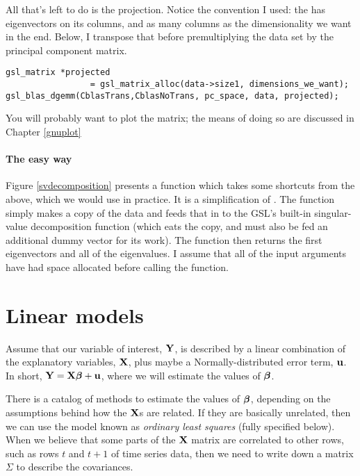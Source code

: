 All that's left to do is the projection. Notice the convention I used:
the  has eigenvectors on its columns, and as many columns as the
dimensionality we want in the end. Below, I transpose that before premultiplying
the data set by the principal component matrix.

\begin{lstlisting}
gsl_matrix *projected 
                 = gsl_matrix_alloc(data->size1, dimensions_we_want);
gsl_blas_dgemm(CblasTrans,CblasNoTrans, pc_space, data, projected);
\end{lstlisting}

You will probably want to plot the  matrix; the means
of doing so are discussed in Chapter \ref{gnuplot}

\paragraph{The easy way}

Figure \ref{svdecomposition} presents a function which takes some
shortcuts from the above, which we would use in practice. It is a
simplification of . The function simply makes
a copy of the data and feeds that in to the GSL's built-in singular-value
decomposition function (which eats the copy, and must also be fed an
additional dummy vector for its work). The function then returns the first
 eigenvectors and all of the eigenvalues. I
assume that all of the input arguments have had space allocated before
calling the function.  




\section{Linear models}
\label{cat}

Assume that our variable of interest, ${\bf Y}$, is
described by a linear combination of the explanatory variables, ${\bf X}$,
plus maybe a Normally-distributed error term, ${\bf u}$. In short,
${\bf Y}={\bf X}{\mbox{\boldmath$\beta$}} + {\bf u}$, where we will estimate the values of ${\mbox{\boldmath$\beta$}}$. 

There is a catalog of methods to estimate the values of ${\mbox{\boldmath$\beta$}}$,
depending on the assumptions behind how the ${\bf X}$s are related. If they
are basically unrelated, then we can use the model known as {\em ordinary
least squares} (fully specified below). When we believe that some parts
of the ${\bf X}$ matrix are correlated to other rows, such as rows $t$ and
$t+1$ of 
time series data, then we need to write down a matrix
$\Sigma$ to describe the covariances.

